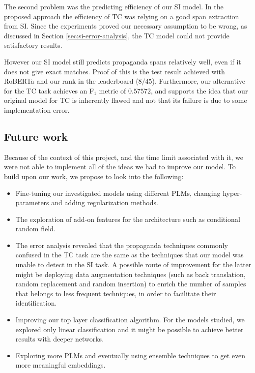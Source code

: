 \documentclass[11pt]{article}
\newcommand{\pol}[1]{{\fontfamily{pcr}\selectfont#1}}
\begin{document}
The second problem was the predicting efficiency of our \pol{SI} model. In the proposed approach the efficiency of \pol{TC} was relying on a good span extraction from \pol{SI}. Since the experiments proved our necessary assumption to be wrong, as discussed in Section \ref{sec:si-error-analysis}, the \pol{TC} model could not provide satisfactory results.

However our \pol{SI} model still predicts propaganda spans relatively well, even if it does not give exact matches. Proof of this is the test result achieved with \pol{RoBERTa} and our rank in the leaderboard ($8 / 45$). Furthermore, our alternative for the \pol{TC} task achieves an F$_1$ metric of $0.57572$, and supports the idea that our original model for \pol{TC} is inherently flawed and not that its failure is due to some implementation error.

\subsection{Future work}
Because of the context of this project, and the time limit associated with it, we were not able to implement all of the ideas we had to improve our model. To build upon our work, we propose to look into the following:
\begin{itemize}
    \item Fine-tuning our investigated models using different \pol{PLM}s, changing hyper-parameters and adding regularization methods. 
    \item The exploration of add-on features for the architecture such as conditional random field.
    \item The error analysis revealed that the propaganda techniques commonly confused in the \pol{TC} task are the same as the techniques that our model was unable to detect in the \pol{SI} task. A possible route of improvement for the latter might be deploying data augmentation techniques (such as back translation, random replacement and random insertion) to enrich the number of samples that belongs to less frequent techniques, in order to facilitate their identification.
    \item Improving our top layer classification algorithm. For the models studied, we explored only linear classification and it might be possible to achieve better results with deeper networks.
    \item Exploring more \pol{PLMs} and eventually using ensemble techniques to get even more meaningful embeddings.
\end{itemize}
\end{document}

